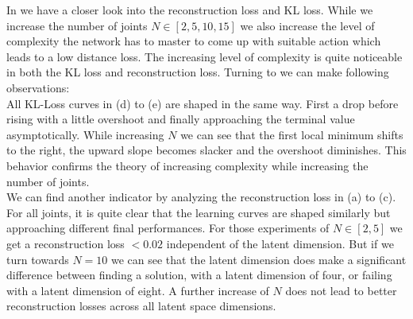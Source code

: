 In  we have a closer look into the reconstruction loss and KL loss. While we increase the number of joints $N \in [2, 5, 10, 15]$ we also increase the level of complexity the network has to master to come up with suitable action which leads to a low distance loss. The increasing level of complexity is quite noticeable in both the KL loss and reconstruction loss. Turning to  we can make following observations:\\
All KL-Loss curves in  (d) to (e) are shaped in the same way. First a drop before rising with a little overshoot and finally approaching the terminal value asymptotically. While increasing $N$ we can see that the first local minimum shifts to the right, the upward slope becomes slacker and the overshoot diminishes. This behavior confirms the theory of increasing complexity while increasing the number of joints.\\
We can find another indicator by analyzing the reconstruction loss in  (a) to (c). For all joints, it is quite clear that the learning curves are shaped similarly but approaching different final performances. For those experiments of $N \in [2, 5]$ we get a reconstruction loss $< 0.02$ independent of the latent dimension. But if we turn towards $N = 10$ we can see that the latent dimension does make a significant difference between finding a solution, with a latent dimension of four, or failing with a latent dimension of eight. A further increase of $N$ does not lead to better reconstruction losses across all latent space dimensions. 
